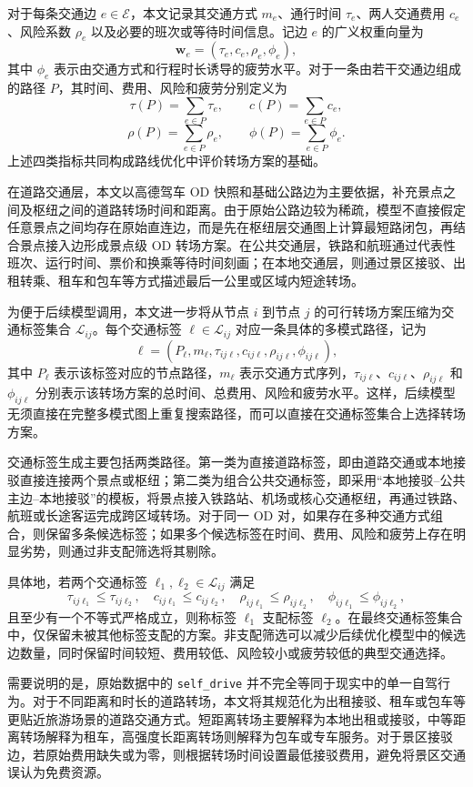 \documentclass[UTF8,zihao=-4,a4paper]{ctexart}
\begin{document}
对于每条交通边 $e\in\mathcal{E}$，本文记录其交通方式 $m_e$、通行时间 $\tau_e$、两人交通费用 $c_e$、风险系数 $\rho_e$ 以及必要的班次或等待时间信息。记边 $e$ 的广义权重向量为
\[
\boldsymbol{w}_e
=
(\tau_e,c_e,\rho_e,\phi_e),
\]
其中 $\phi_e$ 表示由交通方式和行程时长诱导的疲劳水平。对于一条由若干交通边组成的路径 $P$，其时间、费用、风险和疲劳分别定义为
\[
\tau(P)=\sum_{e\in P}\tau_e,\qquad
c(P)=\sum_{e\in P}c_e,
\]
\[
\rho(P)=\sum_{e\in P}\rho_e,\qquad
\phi(P)=\sum_{e\in P}\phi_e.
\]
上述四类指标共同构成路线优化中评价转场方案的基础。

在道路交通层，本文以高德驾车 OD 快照和基础公路边为主要依据，补充景点之间及枢纽之间的道路转场时间和距离。由于原始公路边较为稀疏，模型不直接假定任意景点之间均存在原始直连边，而是先在枢纽层交通图上计算最短路闭包，再结合景点接入边形成景点级 OD 转场方案。在公共交通层，铁路和航班通过代表性班次、运行时间、票价和换乘等待时间刻画；在本地交通层，则通过景区接驳、出租转乘、租车和包车等方式描述最后一公里或区域内短途转场。

为便于后续模型调用，本文进一步将从节点 $i$ 到节点 $j$ 的可行转场方案压缩为交通标签集合 $\mathcal{L}_{ij}$。每个交通标签 $\ell\in\mathcal{L}_{ij}$ 对应一条具体的多模式路径，记为
\[
\ell
=
(P_{\ell},m_{\ell},
\tau_{ij\ell},
c_{ij\ell},
\rho_{ij\ell},
\phi_{ij\ell}),
\]
其中 $P_{\ell}$ 表示该标签对应的节点路径，$m_{\ell}$ 表示交通方式序列，$\tau_{ij\ell}$、$c_{ij\ell}$、$\rho_{ij\ell}$ 和 $\phi_{ij\ell}$ 分别表示该转场方案的总时间、总费用、风险和疲劳水平。这样，后续模型无须直接在完整多模式图上重复搜索路径，而可以直接在交通标签集合上选择转场方案。

交通标签生成主要包括两类路径。第一类为直接道路标签，即由道路交通或本地接驳直接连接两个景点或枢纽；第二类为组合公共交通标签，即采用“本地接驳--公共主边--本地接驳”的模板，将景点接入铁路站、机场或核心交通枢纽，再通过铁路、航班或长途客运完成跨区域转场。对于同一 OD 对，如果存在多种交通方式组合，则保留多条候选标签；如果多个候选标签在时间、费用、风险和疲劳上存在明显劣势，则通过非支配筛选将其剔除。

具体地，若两个交通标签 $\ell_1,\ell_2\in\mathcal{L}_{ij}$ 满足
\[
\tau_{ij\ell_1}\leq \tau_{ij\ell_2},\quad
c_{ij\ell_1}\leq c_{ij\ell_2},\quad
\rho_{ij\ell_1}\leq \rho_{ij\ell_2},\quad
\phi_{ij\ell_1}\leq \phi_{ij\ell_2},
\]
且至少有一个不等式严格成立，则称标签 $\ell_1$ 支配标签 $\ell_2$。在最终交通标签集合中，仅保留未被其他标签支配的方案。非支配筛选可以减少后续优化模型中的候选边数量，同时保留时间较短、费用较低、风险较小或疲劳较低的典型交通选择。

需要说明的是，原始数据中的 \texttt{self\_drive} 并不完全等同于现实中的单一自驾行为。对于不同距离和时长的道路转场，本文将其规范化为出租接驳、租车或包车等更贴近旅游场景的道路交通方式。短距离转场主要解释为本地出租或接驳，中等距离转场解释为租车，高强度长距离转场则解释为包车或专车服务。对于景区接驳边，若原始费用缺失或为零，则根据转场时间设置最低接驳费用，避免将景区交通误认为免费资源。
\end{document}
